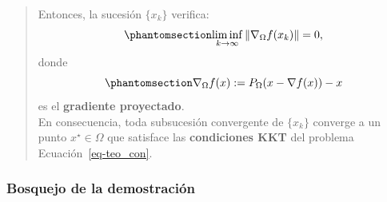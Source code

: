 \documentclass[
  spanish,
  us-letterpaper,
]{scrreprt}
\numberwithin{equation}{section}
\begin{document}
\begin{quote}
Entonces, la sucesión \(\{x_k\}\) verifica:
\begin{equation}\phantomsection\label{eq-liminf}{
\liminf_{k \to \infty} \|\nabla_\Omega f(x_k)\| = 0,
}\end{equation} donde \begin{equation}\phantomsection\label{eq-66}{
\nabla_\Omega f(x) := P_\Omega(x - \nabla f(x)) - x 
}\end{equation} es el \textbf{gradiente proyectado}.\\
En consecuencia, toda subsucesión convergente de \(\{x_k\}\) converge a
un punto \(x^\star \in \Omega\) que satisface las \textbf{condiciones
KKT} del problema Ecuación~\ref{eq-teo_con}.
\end{quote}

\subsubsection{Bosquejo de la
demostración}\label{bosquejo-de-la-demostraciuxf3n}
\end{document}
